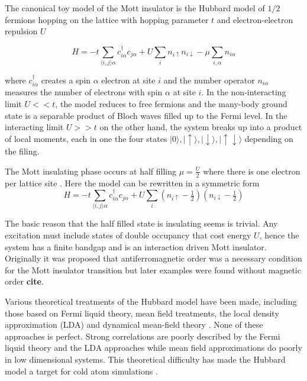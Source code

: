 The canonical toy model of the Mott insulator is the Hubbard model \autocite{gutzwillerEffectCorrelationFerromagnetism1963,kanamoriElectronCorrelationFerromagnetism1963,hubbardj.ElectronCorrelationsNarrow1963} of \(1/2\) fermions hopping on the lattice with hopping parameter \(t\) and electron-electron repulsion \(U\)

\[ H = -t \sum_{\langle i,j \rangle \alpha} c^\dagger_{i\alpha} c_{j\alpha} + U \sum_i n_{i\uparrow} n_{i\downarrow} - \mu \sum_{i,\alpha} n_{i\alpha}\]

where \(c^\dagger_{i\alpha}\) creates a spin \(\alpha\) electron at site \(i\) and the number operator \(n_{i\alpha}\) measures the number of electrons with spin \(\alpha\) at site \(i\). In the non-interacting limit \(U << t\), the model reduces to free fermions and the many-body ground state is a separable product of Bloch waves filled up to the Fermi level. In the interacting limit \(U >> t\) on the other hand, the system breaks up into a product of local moments, each in one the four states \(|0\rangle, |\uparrow\rangle, |\downarrow\rangle, |\uparrow\downarrow\rangle\) depending on the filing.

The Mott insulating phase occurs at half filling \(\mu = \tfrac{U}{2}\) where there is one electron per lattice site \autocite{hubbardElectronCorrelationsNarrow1964}. Here the model can be rewritten in a symmetric form \[ H = -t \sum_{\langle i,j \rangle \alpha} c^\dagger_{i\alpha} c_{j\alpha} + U \sum_i (n_{i\uparrow} - \tfrac{1}{2})(n_{i\downarrow} - \tfrac{1}{2})\]

The basic reason that the half filled state is insulating seems is trivial. Any excitation must include states of double occupancy that cost energy \(U\), hence the system has a finite bandgap and is an interaction driven Mott insulator. Originally it was proposed that antiferromagnetic order was a necessary condition for the Mott insulator transition \autocite{mottMetalInsulatorTransitions1990} but later examples were found without magnetic order \textbf{cite}.

Various theoretical treatments of the Hubbard model have been made, including those based on Fermi liquid theory, mean field treatments, the local density approximation (LDA) \autocite{slaterMagneticEffectsHartreeFock1951} and dynamical mean-field theory \autocite{greinerQuantumPhaseTransition2002}. None of these approaches is perfect. Strong correlations are poorly described by the Fermi liquid theory and the LDA approaches while mean field approximations do poorly in low dimensional systems. This theoretical difficulty has made the Hubbard model a target for cold atom simulations \autocite{mazurenkoColdatomFermiHubbard2017}.

